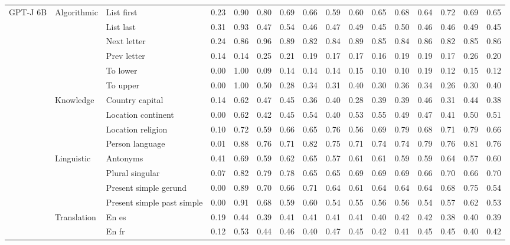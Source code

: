 \begin{center}
\begin{longtable}{lllrrrrrrrrrrrrr}
\multirow[t]{18}{*}{GPT-J 6B} & \multirow[t]{6}{*}{Algorithmic} & List first & 0.23 & 0.90 & 0.80 & 0.69 & 0.66 & 0.59 & 0.60 & 0.65 & 0.68 & 0.64 & 0.72 & 0.69 & 0.65 \\
 &  & List last & 0.31 & 0.93 & 0.47 & 0.54 & 0.46 & 0.47 & 0.49 & 0.45 & 0.50 & 0.46 & 0.46 & 0.49 & 0.45 \\
 &  & Next letter & 0.24 & 0.86 & 0.96 & 0.89 & 0.82 & 0.84 & 0.89 & 0.85 & 0.84 & 0.86 & 0.82 & 0.85 & 0.86 \\
 &  & Prev letter & 0.14 & 0.14 & 0.25 & 0.21 & 0.19 & 0.17 & 0.17 & 0.16 & 0.19 & 0.19 & 0.17 & 0.26 & 0.20 \\
 &  & To lower & 0.00 & 1.00 & 0.09 & 0.14 & 0.14 & 0.14 & 0.15 & 0.10 & 0.10 & 0.19 & 0.12 & 0.15 & 0.12 \\
 &  & To upper & 0.00 & 1.00 & 0.50 & 0.28 & 0.34 & 0.31 & 0.40 & 0.30 & 0.36 & 0.34 & 0.26 & 0.30 & 0.40 \\
\cline{2-16}
 & \multirow[t]{4}{*}{Knowledge} & Country capital & 0.14 & 0.62 & 0.47 & 0.45 & 0.36 & 0.40 & 0.28 & 0.39 & 0.39 & 0.46 & 0.31 & 0.44 & 0.38 \\
 &  & Location continent & 0.00 & 0.62 & 0.42 & 0.45 & 0.54 & 0.40 & 0.53 & 0.55 & 0.49 & 0.47 & 0.41 & 0.50 & 0.51 \\
 &  & Location religion & 0.10 & 0.72 & 0.59 & 0.66 & 0.65 & 0.76 & 0.56 & 0.69 & 0.79 & 0.68 & 0.71 & 0.79 & 0.66 \\
 &  & Person language & 0.01 & 0.88 & 0.76 & 0.71 & 0.82 & 0.75 & 0.71 & 0.74 & 0.74 & 0.79 & 0.76 & 0.81 & 0.76 \\
\cline{2-16}
 & \multirow[t]{4}{*}{Linguistic} & Antonyms & 0.41 & 0.69 & 0.59 & 0.62 & 0.65 & 0.57 & 0.61 & 0.61 & 0.59 & 0.59 & 0.64 & 0.57 & 0.60 \\
 &  & Plural singular & 0.07 & 0.82 & 0.79 & 0.78 & 0.65 & 0.65 & 0.69 & 0.69 & 0.69 & 0.66 & 0.70 & 0.66 & 0.70 \\
 &  & Present simple gerund & 0.00 & 0.89 & 0.70 & 0.66 & 0.71 & 0.64 & 0.61 & 0.64 & 0.64 & 0.64 & 0.68 & 0.75 & 0.54 \\
 &  & Present simple past simple & 0.00 & 0.91 & 0.68 & 0.59 & 0.60 & 0.54 & 0.55 & 0.56 & 0.56 & 0.54 & 0.57 & 0.62 & 0.53 \\
\cline{2-16}
 & \multirow[t]{4}{*}{Translation} & En es & 0.19 & 0.44 & 0.39 & 0.41 & 0.41 & 0.41 & 0.41 & 0.40 & 0.42 & 0.42 & 0.38 & 0.40 & 0.39 \\
 &  & En fr & 0.12 & 0.53 & 0.44 & 0.46 & 0.40 & 0.47 & 0.45 & 0.42 & 0.41 & 0.45 & 0.45 & 0.40 & 0.42 \\

\end{longtable}
\end{center}
